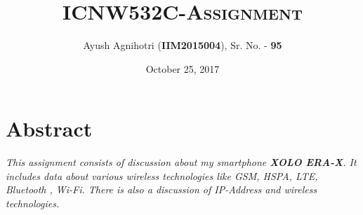 \documentclass{article}
\begin{document}
\title{\scshape\huge \textbf{ICNW532C-Assignment}}
\author{Ayush Agnihotri (\textbf{IIM2015004}), Sr. No. - \textbf{95}}
\date{October 25, 2017}
\maketitle

\part{Abstract}

\large \emph{This assignment consists of discussion about my smartphone \textbf{XOLO ERA-X}. It includes data about various wireless technologies like GSM, HSPA, LTE, Bluetooth , Wi-Fi. There is also a discussion of IP-Address and wireless technologies.}
\vspace{0.02\textheight}
\end{document}
